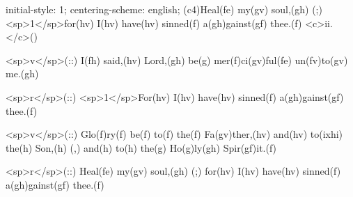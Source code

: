initial-style: 1;
centering-scheme: english;
(c4)Heal(fe) my(gv) soul,(gh) (;) <sp>1</sp>for(hv) I(hv) have(hv) sinned(f) a(gh)gainst(gf) thee.(f) <c>ii.</c>()

<sp>v</sp>(::) I(fh) said,(hv) Lord,(gh) be(g) mer(f)ci(gv)ful(fe) un(fv)to(gv) me.(gh)

<sp>r</sp>(::) <sp>1</sp>For(hv) I(hv) have(hv) sinned(f) a(gh)gainst(gf) thee.(f)

<sp>v</sp>(::) Glo(f)ry(f) be(f) to(f) the(f) Fa(gv)ther,(hv) and(hv) to(ixhi) the(h) Son,(h) (,) and(h) to(h) the(g) Ho(g)ly(gh) Spir(gf)it.(f)

<sp>r</sp>(::) Heal(fe) my(gv) soul,(gh) (;) for(hv) I(hv) have(hv) sinned(f) a(gh)gainst(gf) thee.(f)